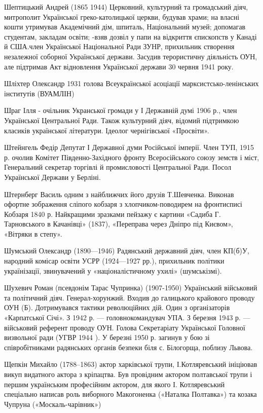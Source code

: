 Шептицький Андрей (1865 1944) Церковний, культурний та громадський діяч, митрополит Української греко-католицької церкви, будував храми; на власні кошти утримував Академічний дім, шпиталь, Національний музей; допомагав студентам, закладам освіти; -взяв дозвіл у папи на відкриття єпископств у Канаді й США.член Української Національної Ради ЗУНР, прихильник створення незалежної соборної Української держави. Засудив терористичну діяльність ОУН, але підтримав Акт відновлення Української держави 30 червня 1941 року. 

Шліхтер Олександр 1931 голова Всеукраїнської асоціації марксистсько-ленінських інститутів (ВУАМЛІН) 

Шраг Ілля - очільник Укранської громади у І Державній думі 1906 р., член Української Центральної Ради. Також культурний діяч, відомий підтримкою класиків української літератури. Ідеолог чернігівської «Просвіти».

Штейнгель Федір Депутат І Державної думи Російської імперії. Член ТУП,  1915 р. очолив Комітет Південно-Західного фронту Всеросійського союзу земств і міст, Генеральний секретар торгівлі й промисловості Центральної Ради. Посол Української Держави у Берліні. 

Штернберг Василь  одним з найближчих його друзів Т.Шевченка. Виконав офортне зображення сліпого кобзаря з хлопчиком-поводирем на фронтисписі Кобзаря 1840 р. Найкращими зразками пейзажу є картини  «Садиба Г. Тарновського в Качанівці» (1837), «Переправа через Дніпро під Києвом», «Вітряки в степу». 

Шумський Олександр (1890—1946) Радянський державний діяч, член КП(б)У, народний комісар освіти УСРР (1924—1927 рр.), прихильник політики українізації, звинувачений у «націоналістичному ухилі» (шумськізмі).

Шухевич Роман (псевдонім Тарас Чупринка) (1907-1950) Український військовий та політичний діяч. Генерал-хорунжий. Входив до галицького крайового проводу ОУН (Б). Дотримувався тактики революційних дій. Один з організаторів «Карпатської Січі». З 1942 р. — головнокомандувач УПА. З березня 1943 р. — військовий референт проводу ОУН. Голова Секретаріату Української Головної визвольної ради (УГВР 1944 ). У березні 1950 р. загинув у бою зі співробітниками радянських органів безпеки біля с. Білогорща, поблизу Львова. 

Щепкін Михайло  (1788–1863) актор харківської трупи, І.Котляревський ініціював викуп видатного актора з кріпацтва. Був провідним актором полтавської трупи і першим українським професійним актором, для якого І. Котляревський спеціально написав роль виборного Макогоненка («Наталка Полтавка») та козака Чупруна («Москаль-чарівник»)

